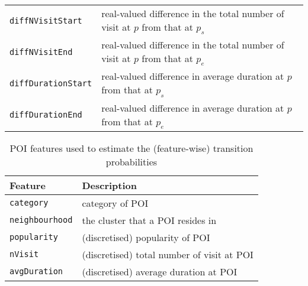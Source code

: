 \documentclass[9pt]{extarticle}
\begin{document}
\begin{table*}[ht]
\begin{tabular}{l|l}
\texttt{diffNVisitStart}        & real-valued difference in the total number of visit at $p$ from that at $p_s$ \\
\texttt{diffNVisitEnd}          & real-valued difference in the total number of visit at $p$ from that at $p_e$ \\
\texttt{diffDurationStart}      & real-valued difference in average duration at $p$ from that at $p_s$ \\
\texttt{diffDurationEnd}        & real-valued difference in average duration at $p$ from that at $p_e$ \\ \hline
\end{tabular}
\end{table*}


\begin{table}[ht]
\caption{POI features used to estimate the (feature-wise) transition probabilities}
\label{tab:tranfeature}
\centering
\setlength{\tabcolsep}{28pt} %
\begin{tabular}{l|l} \hline
\textbf{Feature}       & \textbf{Description} \\ \hline
\texttt{category}      & category of POI \\
\texttt{neighbourhood} & the cluster that a POI resides in \\
\texttt{popularity}    & (discretised) popularity of POI \\
\texttt{nVisit}        & (discretised) total number of visit at POI \\
\texttt{avgDuration}   & (discretised) average duration at POI \\ \hline
\end{tabular}
\end{table}






\end{document}
